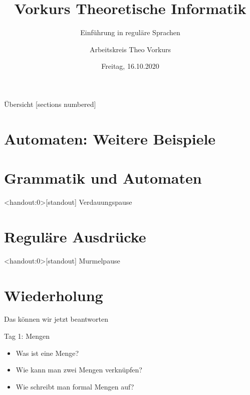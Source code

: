 

\title{Vorkurs Theoretische Informatik}
\subtitle{Einführung in reguläre Sprachen}
\date{Freitag, 16.10.2020}
\author{Arbeitskreis  Theo Vorkurs}



\maketitle

\begin{frame}[fragile]{Übersicht}
  [sections numbered]
  \tableofcontents%
\end{frame}

\section{Automaten: Weitere Beispiele}



\section{Grammatik und Automaten}



\begin{frame}<handout:0>[standout]
  Verdauungspause
\end{frame}

\section{Reguläre Ausdrücke}



\begin{frame}<handout:0>[standout]
  Murmelpause
\end{frame}

\section{Wiederholung}
\begin{frame}[fragile]{Das können wir jetzt beantworten}
  \begin{alertblock}{Tag 1: Mengen}
    \begin{itemize}
      \item Was ist eine Menge?
      \item Wie kann man zwei Mengen verknüpfen?
      \item Wie schreibt man formal Mengen auf?
    \end{itemize}
  \end{alertblock}
\end{frame}

